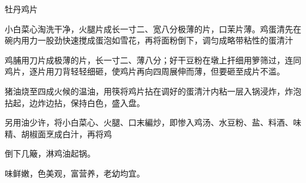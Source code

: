 \begin{recipe}{牡丹鸡片}

\ingredients



\cooking

\step 小白菜心淘洗干净，火腿片成长一寸二、宽八分极薄的片，口茉片薄。鸡蛋清先在碗内用力一股劲快速搅成蛋泡如雪花，再将面粉倒下，调匀成略带粘性的蛋清汁

\step 鸡脯用刀片成极薄的片，长一寸二、薄八分；好干豆粉在墩上扞细用箩筛过，连同鸡片，逐片用刀背轻轻细砸，使鸡片再向四周展伸而薄，但要砸至成片不滥。

\step 猪油烧至四成火候的温油，用筷将鸡片拈在调好的蛋清汁内粘一层入锅浸炸，炸泡拈起，边炸边拈，保持白色，盛入盘。

\step 另用油少许，将小白菜心、火腿、口末編炒，即惨入鸡汤、水豆粉、盐、料酒、味精、胡椒面烹成白汁，再将鸡

倒下几簸，淋鸡油起锅。

\notes

味鲜嫩，色美观，富营养，老幼均宜。

\end{recipe}

